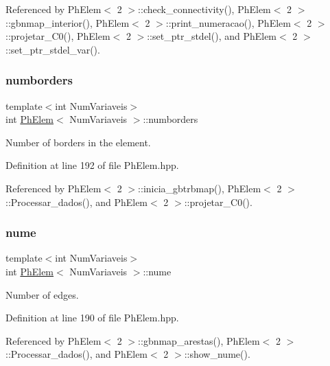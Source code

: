 Referenced by Ph\+Elem$<$ 2 $>$\+::check\+\_\+connectivity(), Ph\+Elem$<$ 2 $>$\+::gbnmap\+\_\+interior(), Ph\+Elem$<$ 2 $>$\+::print\+\_\+numeracao(), Ph\+Elem$<$ 2 $>$\+::projetar\+\_\+\+C0(), Ph\+Elem$<$ 2 $>$\+::set\+\_\+ptr\+\_\+stdel(), and Ph\+Elem$<$ 2 $>$\+::set\+\_\+ptr\+\_\+stdel\+\_\+var().

\mbox{\label{classPhElem_ad24d6fbe02539875405dd4a6cf094284}} 
\subsubsection{\texorpdfstring{numborders}{numborders}}
{\footnotesize\ttfamily template$<$int Num\+Variaveis$>$ \\
int \hyperlink{classPhElem}{Ph\+Elem}$<$ Num\+Variaveis $>$\+::numborders\hspace{0.3cm}{\ttfamily [protected]}}



Number of borders in the element. 



Definition at line 192 of file Ph\+Elem.\+hpp.



Referenced by Ph\+Elem$<$ 2 $>$\+::inicia\+\_\+gbtrbmap(), Ph\+Elem$<$ 2 $>$\+::\+Processar\+\_\+dados(), and Ph\+Elem$<$ 2 $>$\+::projetar\+\_\+\+C0().

\mbox{\label{classPhElem_a1c0c7833feba84d4ed83d172244ca3e1}} 
\subsubsection{\texorpdfstring{nume}{nume}}
{\footnotesize\ttfamily template$<$int Num\+Variaveis$>$ \\
int \hyperlink{classPhElem}{Ph\+Elem}$<$ Num\+Variaveis $>$\+::nume\hspace{0.3cm}{\ttfamily [protected]}}



Number of edges. 



Definition at line 190 of file Ph\+Elem.\+hpp.



Referenced by Ph\+Elem$<$ 2 $>$\+::gbnmap\+\_\+arestas(), Ph\+Elem$<$ 2 $>$\+::\+Processar\+\_\+dados(), and Ph\+Elem$<$ 2 $>$\+::show\+\_\+nume().

